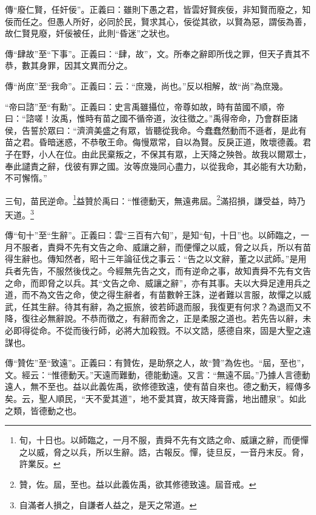 {\noindent\zhuan{}\fzbyks 傳“廢仁賢，任奸佞”。正義曰：雖則下愚之君，皆雲好賢疾佞，非知賢而廢之，知佞而任之。但愚人所好，必同於民，賢求其心，佞從其欲，以賢為惡，謂佞為善，故仁賢見廢，奸佞被任，此則“昏迷”之狀也。 \par}

{\noindent\zhuan{}\fzbyks 傳“肆故”至“下事”。正義曰：“肆，故”，文。所奉之辭即所伐之罪，但天子責其不恭，數其身罪，因其文異而分之。 \par}

{\noindent\zhuan{}\fzbyks 傳“尚庶”至“我命”。正義曰：云：“庶幾，尚也。”反以相解，故“尚”為庶幾。 \par}

{\noindent\shu{}\fzkt “帝曰諮”至“有勳”。正義曰：史言禹雖攝位，帝尊如故，時有苗國不順，帝曰：“諮嗟！汝禹，惟時有苗之國不循帝道，汝往徵之。”禹得帝命，乃會群臣諸侯，告誓於眾曰：“濟濟美盛之有眾，皆聽從我命。今蠢蠢然動而不遜者，是此有苗之君。昏暗迷惑，不恭敬王命。侮慢眾常，自以為賢。反戾正道，敗壞德義。君子在野，小人在位。由此民棄叛之，不保其有眾，上天降之殃咎。故我以爾眾士，奉此譴責之辭，伐彼有罪之國。汝等庶幾同心盡力，以從我命，其必能有大功勳，不可懈惰。” \par}

三旬，苗民逆命。\footnote{旬，十日也。以師臨之，一月不服，責舜不先有文誥之命、威讓之辭，而便憚之以威，脅之以兵，所以生辭。誥，古報反。憚，徒旦反，一音丹末反。脅，許業反。}益贊於禹曰：“惟德動天，無遠弗屆。\footnote{贊，佐。屆，至也。益以此義佐禹，欲其修德致遠。屆音戒。}滿招損，謙受益，時乃天道。\footnote{自滿者人損之，自謙者人益之，是天之常道。}


{\noindent\zhuan{}\fzbyks 傳“旬十”至“生辭”。正義曰：雲“三百有六旬”，是知“旬，十日”也。以師臨之，一月不服者，責舜不先有文告之命、威讓之辭，而便憚之以威，脅之以兵，所以有苗得生辭也。傳知然者，昭十三年論征伐之事云：“告之以文辭，董之以武師。”是用兵者先告，不服然後伐之。今經無先告之文，而有逆命之事，故知責舜不先有文告之命，而即脅之以兵。其“文告之命、威讓之辭”，亦有其事。夫以大舜足達用兵之道，而不為文告之命，使之得生辭者，有苗數幹王誅，逆者難以言服，故憚之以威武，任其生辭。待其有辭，為之振旅，彼若師退而服，我復更有何求？為退而又不降，復往必無辭說。不恭而徵之，有辭而舍之，正是柔服之道也。若先告以辭，未必即得從命。不從而後行師，必將大加殺戮。不以文誥，感德自來，固是大聖之遠謀也。 \par}

{\noindent\zhuan{}\fzbyks 傳“贊佐”至“致遠”。正義曰：有贊佐，是助祭之人，故“贊”為佐也。“屆，至也”，文。經云：“惟德動天。”天遠而難動，德能動遠。又言：“無遠不屆。”乃據人言德動遠人，無不至也。益以此義佐禹，欲修德致遠，使有苗自來也。德之動天，經傳多矣。云，聖人順民，“天不愛其道”，地不愛其寶，故天降膏露，地出醴泉”。如此之類，皆德動之也。 \par}

